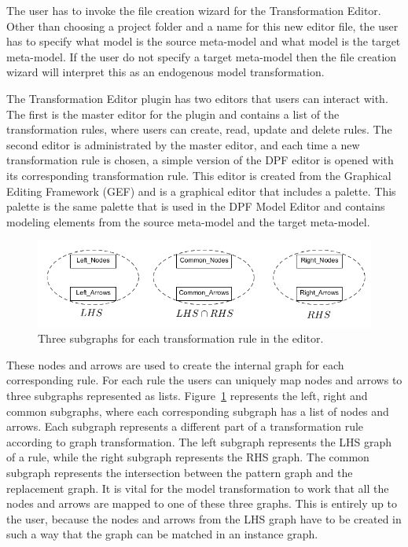 The user has to invoke the file creation wizard for the Transformation Editor.
Other than choosing a project folder and a name for this new editor file, the
user has to specify what model is the source meta-model and what model is the
target meta-model. If the user do not specify a target meta-model then the file
creation wizard will interpret this as an endogenous model transformation.

The Transformation Editor plugin has two editors that users can interact with.
The first is the master editor for the plugin and contains a list of the
transformation rules, where users can create, read, update and delete rules. The
second editor is administrated by the master editor, and each time a new
transformation rule is chosen, a simple version of the DPF editor is opened
with its corresponding transformation rule. This editor is created from the 
Graphical Editing Framework (GEF) and is a graphical editor that includes a
palette. This palette is the same palette that is used in the DPF Model Editor
and contains modeling elements from the source meta-model and the target
meta-model.

\begin{figure}[H]
	\centering
	\includegraphics[scale=0.7]{./Figures/left_common_right.png}
	\caption[The three subgraphs for a transformation rule.]
	{Three subgraphs for each transformation rule in the editor.}
	\label{fig:lists_editor}
\end{figure}

These nodes and arrows are used to create the internal graph for each
corresponding rule. For each rule the users can uniquely map nodes and arrows to
three subgraphs represented as lists. Figure~\ref{fig:lists_editor} represents
the left, right and common subgraphs, where each corresponding subgraph
has a list of nodes and arrows. Each subgraph represents a different part of a
transformation rule according to graph transformation. The left subgraph
represents the LHS graph of a rule, while the right subgraph represents the RHS
graph. The common subgraph represents the intersection between the pattern
graph and the replacement graph. It is vital for the model transformation to
work that all the nodes and arrows are mapped to one of these three graphs.
This is entirely up to the user, because the nodes and arrows from the LHS
graph have to be created in such a way that the graph can be matched in an
instance graph.

